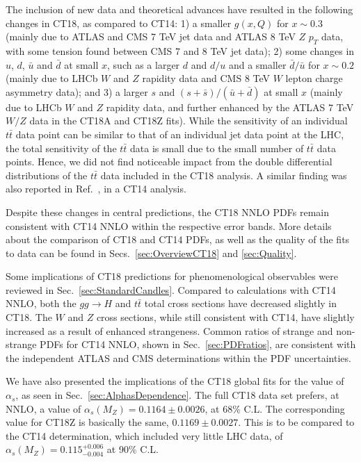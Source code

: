 The inclusion of new data and theoretical advances have resulted in the following changes in CT18, as compared to CT14: 
1) a smaller $g(x,Q)$ for $x \sim 0.3$ (mainly due to ATLAS and CMS 7 TeV jet data and ATLAS 8 TeV $Z$ $p_T$ data, with some tension found between CMS 7 and 8 TeV jet data); 
2) some changes in $u$, $d$, $\bar u$ and $\bar d$ at small $x$, such as a larger $d$ and $d/u$ and a smaller $\bar d / \bar u$ for $x \sim 0.2$ (mainly due to LHCb $W$ and $Z$ rapidity data and CMS 8 TeV $W$ lepton charge asymmetry data); and 
3) a larger $s$ and $(s+\bar s)/(\bar u + \bar d)$ at small $x$ (mainly due to LHCb $W$ and $Z$ rapidity data, and further enhanced by the ATLAS 7 TeV $W/Z$ data in the CT18A and CT18Z fits).
While the sensitivity of an individual $t \bar t$ data point can be similar to that of an individual jet data point at the LHC, the total sensitivity of the $t \bar t$ data is small due to the small number of  $t \bar t$ data points. Hence, we did not find noticeable impact from the double differential distributions of the $t \bar t$ data included in the CT18 analysis. A similar finding was also reported in Ref.~\cite{Hou:2019jxd}, in a CT14 analysis. 

Despite these changes in central predictions, the CT18 NNLO PDFs remain consistent with CT14 NNLO within the respective error bands.
More details about the comparison of CT18 and CT14 PDFs, as well as the quality of the fits to data can be found in Secs.~\ref{sec:OverviewCT18} and \ref{sec:Quality}. 

Some implications of CT18 predictions for phenomenological observables
were reviewed in Sec.~\ref{sec:StandardCandles}.
Compared to calculations with CT14 NNLO, both the $gg \rightarrow H$ and $t\bar t$  total
cross sections have decreased slightly in CT18. The $W$ and $Z$
cross sections, while still consistent with CT14, have slightly increased as a result of enhanced strangeness. Common ratios of
strange and non-strange PDFs for CT14 NNLO, shown in Sec.~\ref{sec:PDFratios}, are consistent with the independent ATLAS and CMS determinations within the PDF uncertainties.

We have also presented the implications of the CT18 global fits for the value of $\alpha_s$, as seen in Sec.~\ref{sec:AlphasDependence}.   
The full CT18 data set prefers, at NNLO, a value of $\alpha_s(M_Z)\! =\! 0.1164\! \pm\! 0.0026$, at 68\% C.L. The corresponding value for CT18Z is basically the same, $0.1169\pm0.0027$.
This is to be compared to the CT14 determination, which included very little LHC data, of $\alpha_s(M_Z)\! =\! 0.115^{+0.006}_{-0.004}$ at 90\% C.L.

